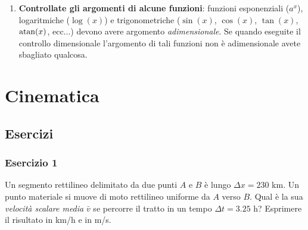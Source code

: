 \documentclass[12pt,a4paper]{book}
\begin{document}
\begin{enumerate}
\item \textbf{Controllate gli argomenti di alcune funzioni}: funzioni esponenziali ($a^x$), logaritmiche ($\log(x)$) e trigonometriche ($\sin(x)$, $\cos(x)$, $\tan(x)$, $\atan(x)$, ecc...) devono avere argomento \textit{adimensionale}. Se quando eseguite il controllo dimensionale l'argomento di tali funzioni non è adimensionale avete sbagliato qualcosa.
\end{enumerate}

\tableofcontents
\thispagestyle{empty}
\newpage

\mainmatter


\chapter{Cinematica}
\section{Esercizi}

\subsection*{Esercizio 1}
Un segmento rettilineo delimitato da due punti $A$ e $B$ è lungo $\Delta x=230$ km. Un punto materiale  si muove di moto rettilineo uniforme da $A$ verso $B$.  Qual è la sua \textit{velocità scalare media} $\bar{v}$  se percorre il tratto in un tempo $\Delta t =3.25$ h? Esprimere il risultato in km/h e in m/s.
 
\end{document}
